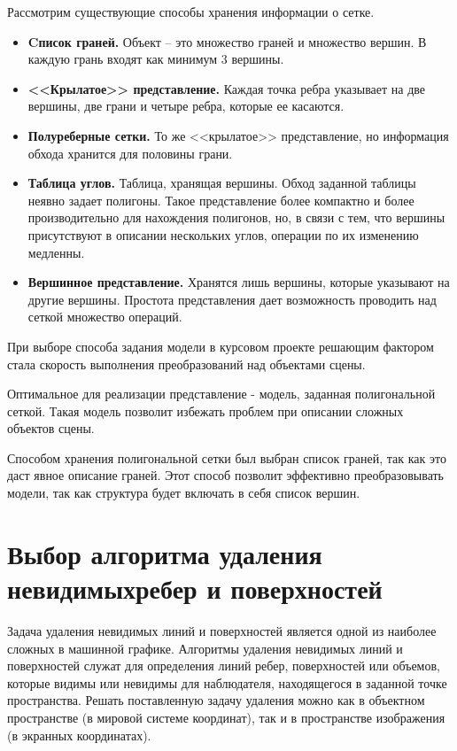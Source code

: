\documentclass[a4paper,14pt, unknownkeysallowed]{extreport}
\begin{document}
Рассмотрим существующие способы хранения информации о сетке.

\begin{itemize}
	\item \textbf{Cписок граней.} Объект -- это множество граней и множество вершин. В каждую грань входят как минимум 3 вершины.
	\item \textbf{<<Крылатое>> представление.} Каждая точка ребра указывает на две вершины, две грани и четыре ребра, которые ее касаются.
	\item \textbf{Полуреберные сетки.} То же <<крылатое>> представление, но информация обхода хранится для половины грани.
	\item \textbf{Таблица углов.} Таблица, хранящая вершины. Обход заданной таблицы неявно задает полигоны. Такое представление более компактно и более производительно для нахождения полигонов, но, в связи с тем, что вершины присутствуют в описании нескольких углов, операции по их изменению медленны.
	\item \textbf{Вершинное представление.} Хранятся лишь вершины, которые указывают на другие вершины. Простота представления дает возможность проводить над сеткой множество операций.
\end{itemize}

При выборе способа задания модели в курсовом проекте решающим фактором стала скорость выполнения преобразований над объектами сцены.

Оптимальное для реализации представление - модель, заданная полигональной сеткой. Такая модель позволит избежать проблем при описании сложных объектов сцены.

Способом хранения полигональной сетки был выбран список граней, так как это даст явное описание граней. Этот способ позволит эффективно преобразовывать модели, так как структура будет включать в себя список вершин.


\section[Выбор алгоритма удаления невидимых ребер и поверхностей]{Выбор алгоритма удаления невидимых\linebreak ребер и поверхностей}

Задача удаления невидимых линий и поверхностей является одной из наиболее сложных в машинной графике. Алгоритмы удаления невидимых линий и поверхностей служат для определения линий ребер, поверхностей или объемов, которые видимы или невидимы для наблюдателя, находящегося в заданной точке пространства. Решать поставленную задачу удаления можно как в объектном пространстве (в мировой системе координат), так и в пространстве изображения (в экранных координатах).
\end{document}
